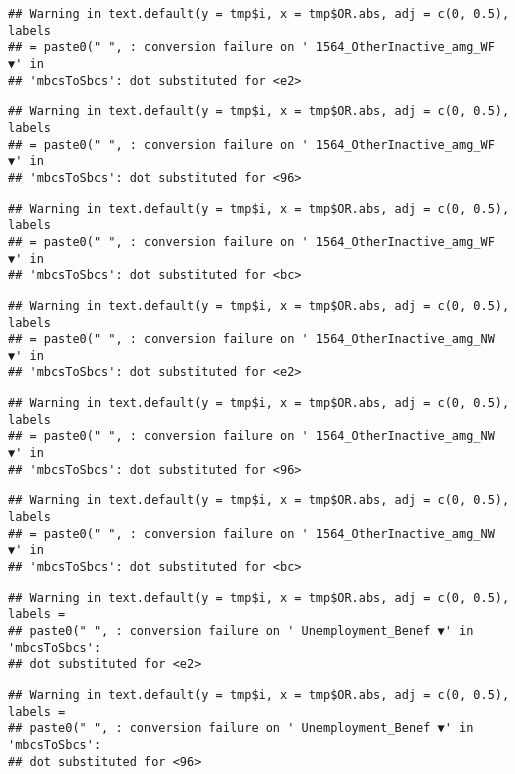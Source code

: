 \documentclass[
]{article}
\begin{document}
\begin{verbatim}
## Warning in text.default(y = tmp$i, x = tmp$OR.abs, adj = c(0, 0.5), labels
## = paste0(" ", : conversion failure on ' 1564_OtherInactive_amg_WF ▼' in
## 'mbcsToSbcs': dot substituted for <e2>
\end{verbatim}

\begin{verbatim}
## Warning in text.default(y = tmp$i, x = tmp$OR.abs, adj = c(0, 0.5), labels
## = paste0(" ", : conversion failure on ' 1564_OtherInactive_amg_WF ▼' in
## 'mbcsToSbcs': dot substituted for <96>
\end{verbatim}

\begin{verbatim}
## Warning in text.default(y = tmp$i, x = tmp$OR.abs, adj = c(0, 0.5), labels
## = paste0(" ", : conversion failure on ' 1564_OtherInactive_amg_WF ▼' in
## 'mbcsToSbcs': dot substituted for <bc>
\end{verbatim}

\begin{verbatim}
## Warning in text.default(y = tmp$i, x = tmp$OR.abs, adj = c(0, 0.5), labels
## = paste0(" ", : conversion failure on ' 1564_OtherInactive_amg_NW ▼' in
## 'mbcsToSbcs': dot substituted for <e2>
\end{verbatim}

\begin{verbatim}
## Warning in text.default(y = tmp$i, x = tmp$OR.abs, adj = c(0, 0.5), labels
## = paste0(" ", : conversion failure on ' 1564_OtherInactive_amg_NW ▼' in
## 'mbcsToSbcs': dot substituted for <96>
\end{verbatim}

\begin{verbatim}
## Warning in text.default(y = tmp$i, x = tmp$OR.abs, adj = c(0, 0.5), labels
## = paste0(" ", : conversion failure on ' 1564_OtherInactive_amg_NW ▼' in
## 'mbcsToSbcs': dot substituted for <bc>
\end{verbatim}

\begin{verbatim}
## Warning in text.default(y = tmp$i, x = tmp$OR.abs, adj = c(0, 0.5), labels =
## paste0(" ", : conversion failure on ' Unemployment_Benef ▼' in 'mbcsToSbcs':
## dot substituted for <e2>
\end{verbatim}

\begin{verbatim}
## Warning in text.default(y = tmp$i, x = tmp$OR.abs, adj = c(0, 0.5), labels =
## paste0(" ", : conversion failure on ' Unemployment_Benef ▼' in 'mbcsToSbcs':
## dot substituted for <96>
\end{verbatim}
\end{document}
